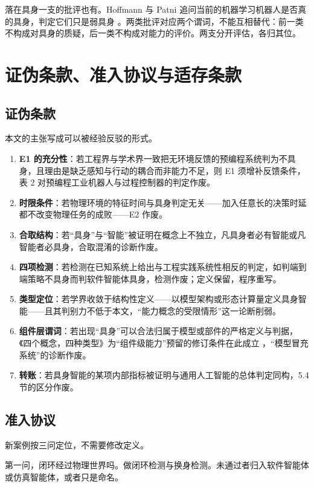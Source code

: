 \documentclass[10pt,fontset=fandol]{ctexart}
\begin{document}
落在具身一支的批评也有。Hoffmann 与 Patni 追问当前的机器学习机器人是否真的具身，判定它们只是弱具身 \cite{hoffmann2025}。两类批评对应两个谓词，不能互相替代：前一类不构成对具身的质疑，后一类不构成对能力的评价。两支分开评估，各归其位。

\section{证伪条款、准入协议与适存条款}\label{sec:s7}

\subsection{证伪条款}

本文的主张写成可以被经验反驳的形式。

\begin{enumerate}
\item \textbf{E1 的充分性}：若工程界与学术界一致把无环境反馈的预编程系统判为不具身，且理由是缺乏感知与行动的耦合而非能力不足，则 E1 须增补反馈条件，表 2 对预编程工业机器人与过程控制器的判定作废。
\item \textbf{时限条件}：若物理环境的特征时间与具身判定无关——加入任意长的决策时延都不改变物理任务的成败——E2 作废。
\item \textbf{合取结构}：若“具身”与“智能”被证明在概念上不独立，凡具身者必有智能或凡智能者必具身，合取混淆的诊断作废。
\item \textbf{四项检测}：若检测在已知系统上给出与工程实践系统性相反的判定，如判端到端策略不具身而判软件智能体具身，检测作废；定义保留，程序重写。
\item \textbf{类型定位}：若学界收敛于结构性定义——以模型架构或形态计算量定义具身智能——且其判别力不低于本文，“能力概念的受限情形”这一论断削弱。
\item \textbf{组件层谓词}：若出现“具身”可以合法归属于模型或部件的严格定义与判据，《四个概念，四种类型》为“组件级能力”预留的修订条件在此成立 \cite{yu2026four}，“模型冒充系统”的诊断作废。
\item \textbf{转账}：若具身智能的某项内部指标被证明与通用人工智能的总体判定同构，5.4 节的区分作废。
\end{enumerate}
\subsection{准入协议}

新案例按三问定位，不需要修改定义。

第一问，闭环经过物理世界吗。做闭环检测与换身检测。未通过者归入软件智能体或仿真智能体，或者只是命名。
\end{document}
